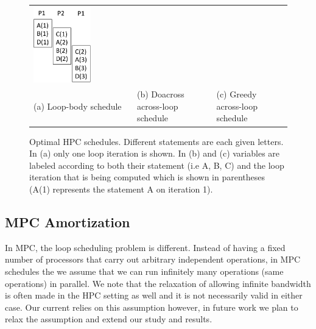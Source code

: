 \begin{figure}[tbhp]
\begin{tabular}{lll}
\begin{minipage}[b]{4.20cm}
\centering
\includegraphics[width=0.6\textwidth]{images/HPCgreedyLoop.pdf}
\end{minipage}

\\

(a) Loop-body schedule
&
(b) Doacross across-loop schedule
& 
(c) Greedy across-loop schedule

\end{tabular}
\caption{Optimal HPC schedules. Different statements are each given letters. 
In (a) only one loop iteration is shown. In (b) and (c) variables 
are labeled according to both their statement (i.e A, B, C) and the loop iteration that is being 
computed which is shown in parentheses (A(1) represents the statement A on iteration 1).}
\label{fig:HPCexample}\vspace{-2ex}
\end{figure}

\subsection{MPC Amortization}
\label{sec:mpcamortization} 

In MPC, the loop scheduling problem is different. Instead of having a fixed number of 
processors that carry out arbitrary independent operations, in MPC schedules the we assume that we can run
infinitely many operations (same operations) in parallel. We note that the relaxation of allowing infinite bandwidth 
is often made in the HPC setting as well and it is not necessarily valid in either case. 
Our current relies on this assumption however, in future work we plan to relax the 
assumption and extend our study and results.

